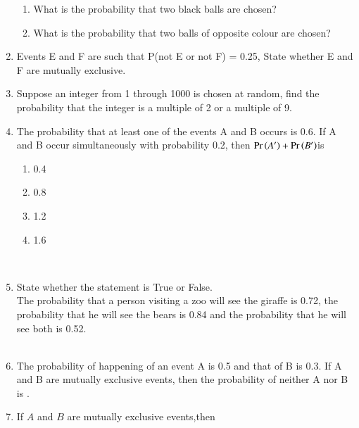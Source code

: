 \begin{enumerate}[label=\thesection.\arabic*,ref=\thesection.\theenumi]
		\begin{enumerate}[label=(\alph*)]
		\item What is the probability that two black balls are chosen?
		
		\item What is the probability that two balls of opposite colour are chosen?
		\end{enumerate}
		\solution
		
\item Events E and F are such that P(not E or not F) = 0.25, State whether E and F are
mutually exclusive.

\item Suppose an integer from 1 through 1000 is chosen at random, find the probability that the integer is a multiple of 2 or a multiple of 9.

\item The probability that at least one of the events A and B occurs is 0.6. If A and B occur simultaneously with probability 0.2, then $\Pr\left(A^\prime\right)+\Pr\left(B^\prime\right) $is\\
\begin{enumerate}
\item 0.4\\
\item 0.8\\
\item 1.2\\
\item 1.6\\
\end{enumerate}
\solution \\

\item State whether the statement is True or False.\\
The probability that a person visiting a zoo will see the giraffe is 0.72, the probability that he will see the bears is 0.84 and the probability that he will see both is 0.52.\\
\solution
\\

\item The probability of happening of an event A is 0.5 and that of B is 0.3. If A and B are mutually exclusive events, then the probability of neither A nor B is \underline{\phantom{Blank}}.
	\\	
\item If $A$ and $B$ are mutually exclusive events,then

\end{enumerate}
